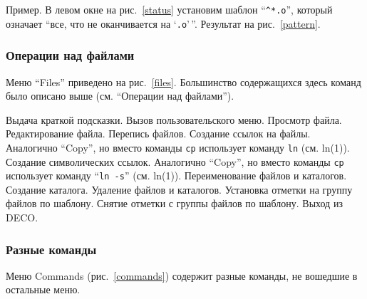 Пример. В левом окне на рис.~\ref{status} установим
шаблон ``{\tt \^{}*.o}'', который
означает ``все, что не оканчивается на `{\tt .o}'\,''. Результат на
рис.~\ref{pattern}.


\subsubsection{Операции над файлами}

Меню ``Files'' приведено на рис.~\ref{files}. Большинство содержащихся
здесь команд было описано выше (см. ``Операции над файлами'').

\begin{example}
Выдача краткой подсказки.
Вызов пользовательского меню.
Просмотр файла.
Редактирование файла.
Перепись файлов.
Создание ссылок на файлы.
Аналогично ``Copy'', но вместо команды {\tt cp}
использует команду {\tt ln} (см. ln(1)).
Создание символических ссылок.
Аналогично ``Copy'', но вместо команды {\tt cp}
использует команду ``{\tt ln -s}'' (см. ln(1)).
Переименование файлов и каталогов.
Создание каталога.
Удаление файлов и каталогов.
Установка отметки на группу файлов по шаблону.
Снятие отметки с группы файлов по шаблону.
Выход из DECO.
\end{example}


\subsubsection{Разные команды}

Меню Commands (рис.~\ref{commands}) содержит разные команды, не
вошедшие в остальные меню.


